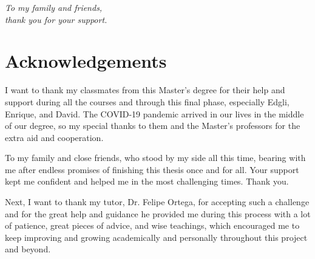 \documentclass[a4paper, 12pt]{book}
\begin{document}
\begin{flushright}
\textit{To my family and friends, \\
thank you for your support.}
\end{flushright}




\chapter*{Acknowledgements}




I want to thank my classmates from this Master's degree for their help and support during all the courses and through this final phase, especially Edgli, Enrique, and David. The COVID-19 pandemic arrived in our lives in the middle of our degree, so my special thanks to them and the Master's professors for the extra aid and cooperation.

To my family and close friends, who stood by my side all this time, bearing with me after endless promises of finishing this thesis once and for all. Your support kept me confident and helped me in the most challenging times. Thank you.

Next, I want to thank my tutor, Dr. Felipe Ortega, for accepting such a challenge and for the great help and guidance he provided me during this process with a lot of patience, great pieces of advice, and wise teachings, which encouraged me to keep improving and growing academically and personally throughout this project and beyond.
\end{document}
